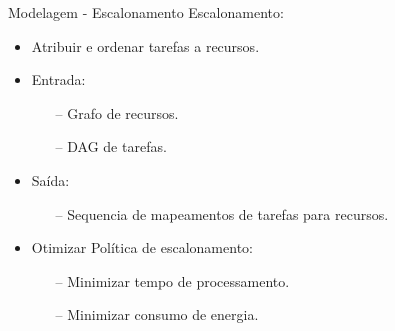 \begin{frame}{Modelagem - Escalonamento}
    Escalonamento:
    \begin{itemize}
        \item Atribuir e ordenar tarefas a recursos.
        \item Entrada:
        \begin{itemize}
            \item[--] Grafo de recursos.
            \item[--] DAG de tarefas.
        \end{itemize}
        \item Saída:
        \begin{itemize}
            \item[--] Sequencia de mapeamentos de tarefas para recursos.
        \end{itemize}
        \item Otimizar Política de escalonamento:
        \begin{itemize}
            \item[--] Minimizar tempo de processamento.
            \item[--] Minimizar consumo de energia.
        \end{itemize}
    \end{itemize}
\end{frame}